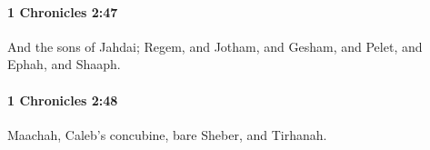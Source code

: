 		\paragraph{1 Chronicles 2:47} %
			\label{1CHRONICLES-2-47}

			And the sons of Jahdai; Regem, and Jotham, and Gesham, and Pelet, and Ephah, and Shaaph.


		\paragraph{1 Chronicles 2:48} %
			\label{1CHRONICLES-2-48}

			Maachah, Caleb’s concubine, bare Sheber, and Tirhanah.


